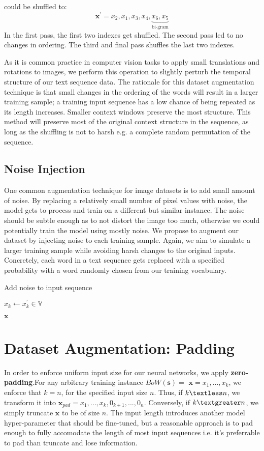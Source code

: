  could be shuffled to:
\[\bm{x}^{\prime} = x_2, x_1, x_3, x_4, \underbrace{x_6, x_5}_\text{bi-gram}\]
In the first pass, the first two indexes get shuffled. The second pass led to no changes in ordering. The third and
final pass shuffles the last two indexes.

As it is common practice in computer vision tasks to apply small translations and rotations to images, we perform
this operation to slightly perturb the temporal structure of our text sequence data.
The rationale for this dataset augmentation technique is that small changes in the ordering of the words will
result in a larger training sample; a training input sequence has a low chance of being repeated as its
length increases. Smaller context windows preserve the most structure. This method will preserve
most of the original context structure in the sequence, as long as the shuffling is not to harsh e.g.
a complete random permutation of the sequence.

\subsection{Noise Injection}
One common augmentation technique for image datasets is to add small amount of noise. By replacing a relatively small
number of pixel values with noise, the model gets to process and train on a different but similar instance. The noise should be subtle
enough as to not distort the image too much, otherwise we could potentially train the model using mostly noise.
We propose to augment our dataset by injecting noise to each training sample. Again, we aim to simulate
a larger training sample while avoiding harsh changes to the original inputs. Concretely, each word in a text sequence gets replaced
with a specified probability with a word randomly chosen from our training vocabulary.
\begin{algorithm}[H]
\caption{Add noise to input sequence}
\begin{algorithmic}[1]
\State$x_k \gets x^{\prime}_k \in \mathbb{V}$
\EndIf
\EndFor

\Return $\bm{x}$
\EndProcedure
\end{algorithmic}
\end{algorithm}


\section{Dataset Augmentation: Padding}
In order to enforce uniform input size for our neural networks,
we apply \textbf{zero-padding}.For any arbitrary training instance $BoW(\bm{s})=$ $\bm{x} = x_1,...,x_k$, we enforce that $k = n$, for the specified input size
$n$. Thus, if $k \textless n$, we transform it into $\bm{x}_{pad} = x_1,...,x_k, 0_{k+1}, ..., 0_{n}$. Conversely, if
$k \textgreater n$, we simply truncate $\bm{x}$ to be of size $n$. The input length introduces another model hyper-parameter
that should be fine-tuned, but a reasonable approach is to pad enough to fully accomodate
the length of most input sequences i.e. it’s preferrable to pad than truncate and lose
information.

